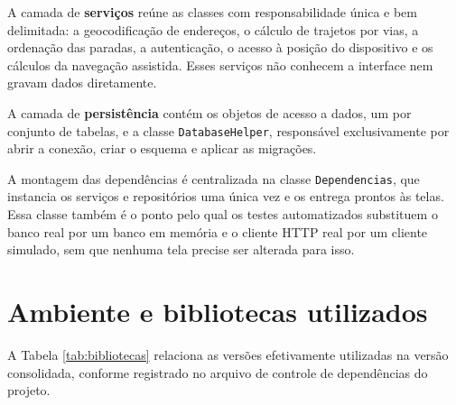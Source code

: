 A camada de \textbf{serviços} reúne as classes com responsabilidade única e bem delimitada: a geocodificação de endereços, o cálculo de trajetos por vias, a ordenação das paradas, a autenticação, o acesso à posição do dispositivo e os cálculos da navegação assistida. Esses serviços não conhecem a interface nem gravam dados diretamente.

A camada de \textbf{persistência} contém os objetos de acesso a dados, um por conjunto de tabelas, e a classe \texttt{DatabaseHelper}, responsável exclusivamente por abrir a conexão, criar o esquema e aplicar as migrações.

A montagem das dependências é centralizada na classe \texttt{Dependencias}, que instancia os serviços e repositórios uma única vez e os entrega prontos às telas. Essa classe também é o ponto pelo qual os testes automatizados substituem o banco real por um banco em memória e o cliente HTTP real por um cliente simulado, sem que nenhuma tela precise ser alterada para isso.

\section{Ambiente e bibliotecas utilizados}

A Tabela \ref{tab:bibliotecas} relaciona as versões efetivamente utilizadas na versão consolidada, conforme registrado no arquivo de controle de dependências do projeto.

